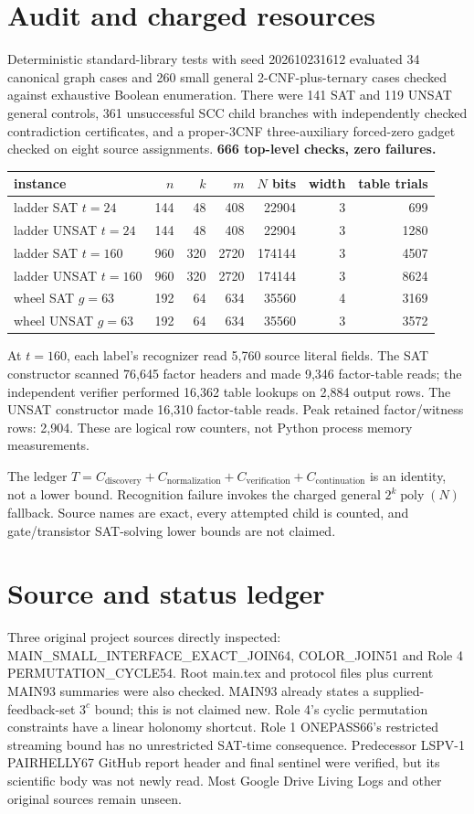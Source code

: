 \documentclass[11pt]{article}
\begin{document}
\section{Audit and charged resources}
Deterministic standard-library tests with seed 202610231612 evaluated 34 canonical graph cases and 260 small general 2-CNF-plus-ternary cases checked against exhaustive Boolean enumeration. There were 141 SAT and 119 UNSAT general controls, 361 unsuccessful SCC child branches with independently checked contradiction certificates, and a proper-3CNF three-auxiliary forced-zero gadget checked on eight source assignments. \textbf{666 top-level checks, zero failures.}
\begin{center}\small
\begin{tabular}{lrrrrrr}
\toprule
instance&\(n\)&\(k\)&\(m\)&\(N\) bits&width&table trials\\
\midrule
ladder SAT \(t=24\)&144&48&408&22904&3&699\\
ladder UNSAT \(t=24\)&144&48&408&22904&3&1280\\
ladder SAT \(t=160\)&960&320&2720&174144&3&4507\\
ladder UNSAT \(t=160\)&960&320&2720&174144&3&8624\\
wheel SAT \(g=63\)&192&64&634&35560&4&3169\\
wheel UNSAT \(g=63\)&192&64&634&35560&3&3572\\
\bottomrule
\end{tabular}\end{center}
At \(t=160\), each label's recognizer read 5,760 source literal fields. The SAT constructor scanned 76,645 factor headers and made 9,346 factor-table reads; the independent verifier performed 16,362 table lookups on 2,884 output rows. The UNSAT constructor made 16,310 factor-table reads. Peak retained factor/witness rows: 2,904. These are logical row counters, not Python process memory measurements.

The ledger \(T=C_{\mathrm{discovery}}+C_{\mathrm{normalization}}+C_{\mathrm{verification}}+C_{\mathrm{continuation}}\) is an identity, not a lower bound. Recognition failure invokes the charged general \(2^k\operatorname{poly}(N)\) fallback. Source names are exact, every attempted child is counted, and gate/transistor SAT-solving lower bounds are not claimed.

\section{Source and status ledger}
Three original project sources directly inspected: MAIN\_SMALL\_INTERFACE\_EXACT\_JOIN64, COLOR\_JOIN51 and Role 4 PERMUTATION\_CYCLE54. Root main.tex and protocol files plus current MAIN93 summaries were also checked. MAIN93 already states a supplied-feedback-set \(3^c\) bound; this is not claimed new. Role 4's cyclic permutation constraints have a linear holonomy shortcut. Role 1 ONEPASS66's restricted streaming bound has no unrestricted SAT-time consequence. Predecessor LSPV-1 PAIRHELLY67 GitHub report header and final sentinel were verified, but its scientific body was not newly read. Most Google Drive Living Logs and other original sources remain unseen.
\end{document}
